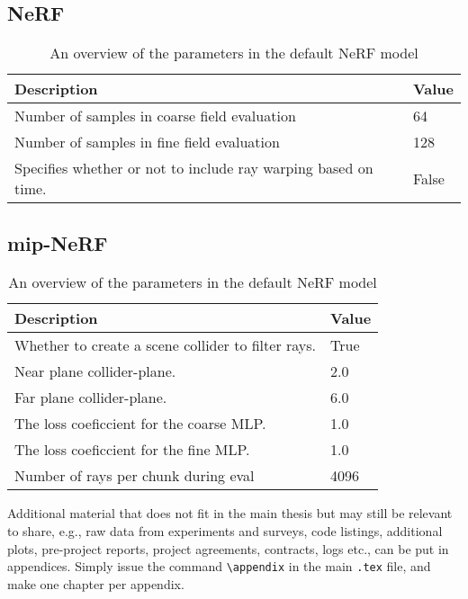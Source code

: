 \subsection{NeRF}
\begin{table}[h]
    \centering
    \begin{tabular}{|l|l|}
    \hline
    \textbf{Description} & \textbf{Value} \\ 
    \hline
    Number of samples in coarse field evaluation & 64 \\
    Number of samples in fine field evaluation & 128 \\
    Specifies whether or not to include ray warping based on time. & False \\
    \hline
    \end{tabular}
    \caption{An overview of the parameters in the default NeRF model}
    \label{tab:instant-ngp-parameter-overview}
\end{table}

\subsection{mip-NeRF}
\begin{table}[h]
    \centering
    \begin{tabular}{|l|l|}
    \hline
    \textbf{Description} & \textbf{Value} \\ 
    \hline
    Whether to create a scene collider to filter rays.  & True \\
    Near plane collider-plane.                          & 2.0 \\
    Far plane collider-plane.                           & 6.0 \\
    The loss coeficcient for the coarse MLP.            & 1.0 \\
    The loss coeficcient for the fine MLP.              & 1.0 \\
    Number of rays per chunk during eval                & 4096 \\
    \hline
    \end{tabular}
    \caption{An overview of the parameters in the default NeRF model}
    \label{tab:instant-ngp-parameter-overview}
\end{table}

Additional material that does not fit in the main thesis but may still be relevant to share, e.g., raw data from experiments and surveys, code listings, additional plots, pre-project reports, project agreements, contracts, logs etc., can be put in appendices. Simply issue the command \texttt{\textbackslash appendix} in the main \texttt{.tex} file, and make one chapter per appendix.

